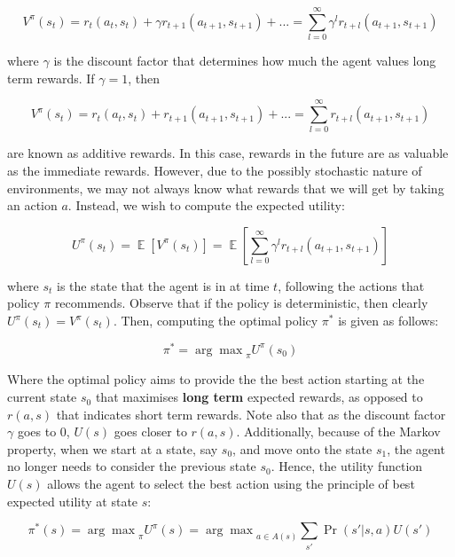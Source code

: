 \documentclass[12pt]{article}
\DeclareMathOperator{\E}{\mathbb{E}}
\begin{document}
 \begin{equation*}
V^{\pi}(s_t) = r_t(a_t, s_t) + \gamma r_{t+1}(a_{t+1}, s_{t+1}) + ... = \sum^{\infty}_{l = 0} \gamma^l r_{t+l}(a_{t+1}, s_{t+1})
\end{equation*}

where $\gamma$ is the discount factor that determines how much the agent values long term rewards. If $\gamma = 1$, then

 \begin{equation*}
V^{\pi}(s_t) = r_t(a_t, s_t) + r_{t+1}(a_{t+1}, s_{t+1}) + ... = \sum^{\infty}_{l = 0} r_{t+l}(a_{t+1}, s_{t+1})
\end{equation*}

are known as additive rewards. In this case, rewards in the future are as valuable as the immediate rewards. However, due to the possibly stochastic nature of environments, we may not always know what rewards that we will get by taking an action $a$. Instead, we wish to compute the expected utility:

\begin{equation*}
U^{\pi}(s_t) = \E[V^{\pi}(s_t)] = \E[\sum^{\infty}_{l = 0} \gamma^l r_{t+l}(a_{t+1}, s_{t+1})]
\end{equation*}

where $s_t$ is the state that the agent is in at time $t$, following the actions that policy $\pi$ recommends. Observe that if the policy is deterministic, then clearly $U^{\pi}(s_t) = V^{\pi}(s_t)$. Then, computing the optimal policy $\pi^*$ is given as follows:

\begin{equation*}
\pi^* = {\arg \max}_{\pi} U^{\pi}(s_0)
\end{equation*}

Where the optimal policy aims to provide the the best action starting at the current state $s_0$ that maximises \textbf{long term} expected rewards, as opposed to $r(a, s)$ that indicates short term rewards. Note also that as the discount factor $\gamma$ goes to 0, $U(s)$ goes closer to $r(a, s)$. Additionally, because of the Markov property, when we start at a state, say $s_0$, and move onto the state $s_1$, the agent no longer needs to consider the previous state $s_0$. Hence, the utility function $U(s)$ allows the agent to select the best action using the principle of best expected utility at state $s$:

\begin{equation*}
\pi^*(s) = {\arg \max}_{\pi} U^{\pi}(s) = {\arg \max}_{a \in A(s)} \sum_{s'} \Pr(s' | s, a) U(s') 
\end{equation*}
\end{document}
